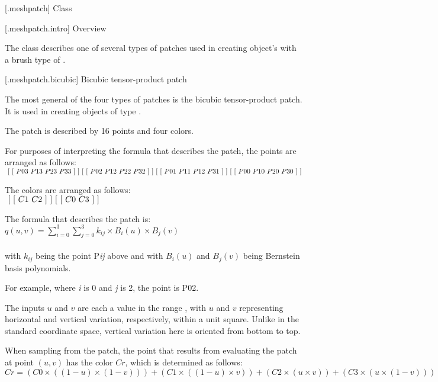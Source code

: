  [\iotwod.meshpatch] {Class }

 [\iotwod.meshpatch.intro] {Overview}

\pnum
{}%
The  class describes one of several types of patches used in creating  object's with a brush type of . 

 [\iotwod.meshpatch.bicubic] {Bicubic tensor-product patch}

\pnum
The most general of the four types of patches is the bicubic tensor-product patch. It is used in creating  objects of type .

\pnum
The patch is described by 16 points and four colors.

\pnum
For purposes of interpreting the formula that describes the patch, the points are arranged as follows: \\
$
~[~[~P03~P13~P23~P33~]~] \\
~[~[~P02~P12~P22~P32~]~] \\
~[~[~P01~P11~P12~P31~]~] \\
~[~[~P00~P10~P20~P30~]~]$

\pnum
The colors are arranged as follows: \\
$
~[~[~C1~C2~]~] \\
~[~[~C0~C3~]~]$

\pnum
The formula that describes the patch is: \\
$
\displaystyle q(u,v) = \sum_{i=0}^{3}\sum_{j=0}^{3}k_{ij}\times{}B_{i}(u)\times{}B_{j}(v)
$ \\
\\
with $k_{ij}$ being the point P\textit{i}\textit{j} above and with $B_{i}(u)$ and $B_{j}(v)$ being Bernstein basis polynomials.

\pnum
\begin{note}
For example, where \textit{i} is 0 and \textit{j} is 2, the point is P02.
\end{note}

\pnum
The inputs $u$ and $v$ are each a value in the range , with $u$ and $v$ representing horizontal and vertical variation, respectively, within a unit square. Unlike in the standard coordinate space, vertical variation here is oriented from bottom to top.

\pnum
When sampling from the patch, the point that results from evaluating the patch at point $(u,v)$ has the color $Cr$, which is determined as follows: \\
$
Cr=(C0\times{}((1 - u)\times{}(1-v)))+(C1\times{}((1-u)\times{}v))+(C2\times{}(u\times{}v))+(C3\times{}(u\times{}(1-v)))$

